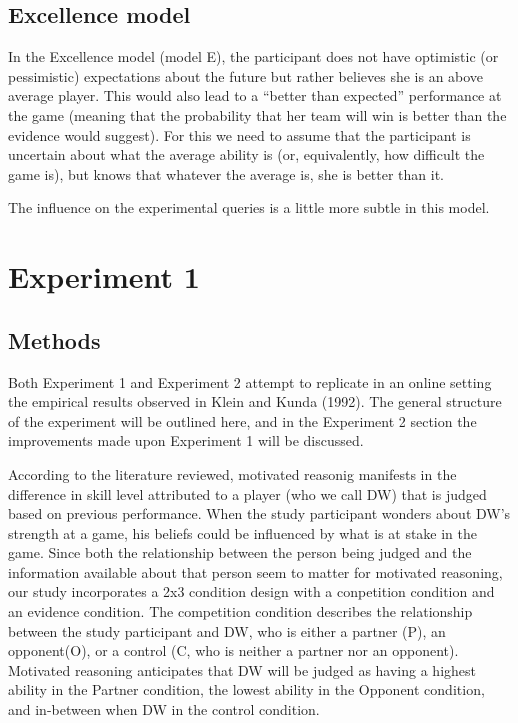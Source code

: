 \documentclass{article}
\begin{document}
\subsection{Excellence model}
In the Excellence model (model E), the participant does not have optimistic (or pessimistic) expectations about the future but rather believes she is an above average player. This would also lead to a ``better than expected'' performance at the game (meaning that the probability that her team will win is better than the evidence would suggest). For this we need to assume that the participant is uncertain about what the average ability is (or, equivalently, how difficult the game is), but knows that whatever the average is, she is better than it.

The influence on the experimental queries is a little more subtle in this model. 

\section{Experiment 1}

\subsection{Methods}

Both Experiment 1 and Experiment 2 attempt to replicate in an online setting the empirical results observed in Klein and Kunda (1992). The general structure of the experiment will be outlined here, and in the Experiment 2 section the improvements made upon Experiment 1 will be discussed.

According to the literature reviewed, motivated reasonig manifests in the difference in skill level attributed to a player (who we call DW) that is judged based on previous performance. When the study participant wonders about DW's strength at a game, his beliefs could be influenced by what is at stake in the game. Since both the relationship between the person being judged and the information available about that person seem to matter for motivated reasoning, our study incorporates a 2x3 condition design with a conpetition condition and an evidence condition. The competition condition describes the relationship between the study participant and DW, who is either a partner (P), an opponent(O), or a control (C, who is neither a partner nor an opponent). Motivated reasoning anticipates that DW will be judged as having a highest ability in the Partner condition, the lowest ability in the Opponent condition, and in-between when DW in the control condition. 
\end{document}
